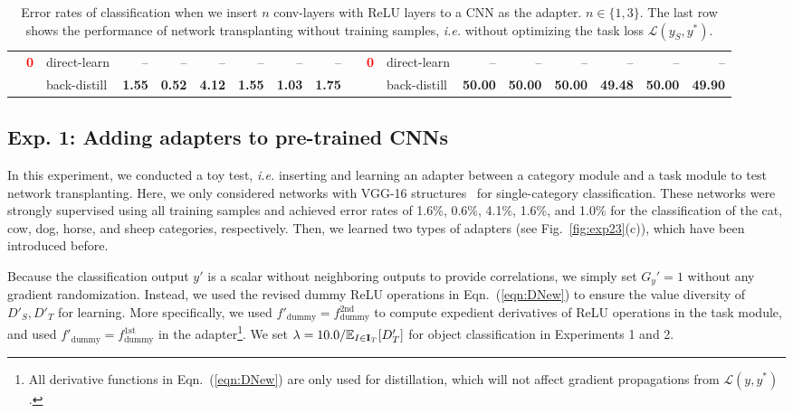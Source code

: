 \documentclass[10pt,twocolumn,letterpaper]{article}
\begin{document}
\begin{table*}
\begin{center}
{\begin{tabular}{c|cl|rrrrr|r|c|cl|rrrrr|r|}
\cline{2-9}\cline{11-18}
&\multirow{2}{*}{\textcolor{red}{\bf0}}&{direct-learn} & -- & -- & -- & -- & -- & --
&&
\multirow{2}{*}{\textcolor{red}{\bf0}}&{direct-learn} & -- & -- & -- & -- & -- & --\\
&&{back-distill} & {\bf1.55}
& {\bf0.52}
& {\bf4.12}
& {\bf1.55}
& {\bf1.03}
& {\bf1.75}
&&
&{back-distill} & {\bf50.00}
& {\bf50.00}
& {\bf50.00}
& {\bf49.48}
& {\bf50.00}
& {\bf49.90}\\
\cline{2-9}\cline{11-18}
\end{tabular}}
\vspace{2pt}
\caption{Error rates of classification when we insert $n$ conv-layers with ReLU layers to a CNN as the adapter. {\small$n\in\{1,3\}$}. The last row shows the performance of network transplanting without training samples, \emph{i.e.} without optimizing the task loss {\small$\mathcal{L}(y_{S},y^{*})$}.}
\label{tab:exp1}
\end{center}
\end{table*}

\subsection{Exp. 1: Adding adapters to pre-trained CNNs}

In this experiment, we conducted a toy test, \emph{i.e.} inserting and learning an adapter between a category module and a task module to test network transplanting. Here, we only considered networks with VGG-16 structures~\cite{VGG} for single-category classification. These networks were strongly supervised using all training samples and achieved error rates of 1.6\%, 0.6\%, 4.1\%, 1.6\%, and 1.0\% for the classification of the cat, cow, dog, horse, and sheep categories, respectively. Then, we learned two types of adapters (see Fig.~\ref{fig:exp23}(c)), which have been introduced before.

Because the classification output $y'$ is a scalar without neighboring outputs to provide correlations, we simply set {\small$G_y'\!=\!1$} without any gradient randomization. Instead, we used the revised dummy ReLU operations in Eqn.~(\ref{eqn:DNew}) to ensure the value diversity of {\small$D'_{S},D'_{T}$} for learning. More specifically, we used {\small$f'_{\textrm{dummy}}=f^{\textrm{2nd}}_{\textrm{dummy}}$} to compute expedient derivatives of ReLU operations in the task module, and used {\small$f'_{\textrm{dummy}}=f^{\textrm{1st}}_{\textrm{dummy}}$} in the adapter\footnote[4]{All derivative functions in Eqn.~(\ref{eqn:DNew}) are only used for distillation, which will not affect gradient propagations from $\mathcal{L}(y,y^{*})$.}. We set {\small$\lambda=10.0/{\mathbb E}_{I\in{\bf I}_{T}}[D'_{T}]$} for object classification in Experiments 1 and 2.
\end{document}
